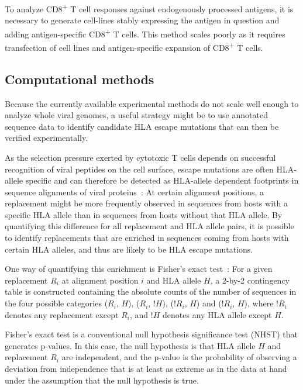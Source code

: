 \documentclass[fleqn,11pt]{SelfArx} %
\begin{document}
To analyze CD8\textsuperscript{+} T cell responses against endogenously processed antigens, it is necessary to generate cell-lines stably expressing the antigen in question and adding antigen-specific CD8\textsuperscript{+} T cells. This method scales poorly as it requires transfection of cell lines and antigen-specific expansion of CD8\textsuperscript{+} T cells.

\subsection{Computational methods}

Because the currently available experimental methods do not scale well enough to analyze whole viral genomes, a useful strategy might be to use annotated sequence data to identify candidate HLA escape mutations that can then be verified experimentally.

As the selection pressure exerted by cytotoxic T cells depends on successful recognition of viral peptides on the cell surface, escape mutations are often HLA-allele specific and can therefore be detected as HLA-allele dependent footprints in sequence alignments of viral proteins~\cite{Moore2002}: At certain alignment positions, a replacement might be more frequently observed in sequences from hosts with a specific HLA allele than in  sequences from hosts without that HLA allele. By quantifying this difference for all replacement and HLA allele pairs, it is possible to identify replacements that are enriched in sequences coming from hosts with certain HLA alleles, and thus are likely to be HLA escape mutations.

One way of quantifying this enrichment is Fisher's exact test~\cite{Fisher1922}: For a given replacement \(R_{i}\) at alignment position \(i\) and HLA allele \(H\), a 2-by-2 contingency table is constructed containing the absolute counts of the number of sequences in the four possible categories  (\(R_{i}\), \(H\)), (\(R_{i}\), \(!H\)), (\(!R_{i}\), \(H\)) and (\(!R_{i}\), \(H\)), where \(!R_{i}\) denotes any replacement except \(R_{i}\), and \(!H\) denotes any HLA allele except \(H\).

Fisher's exact test is a conventional null hypothesis significance test (NHST) that generates p-values. In this case, the null hypothesis is that HLA allele \(H\) and  replacement \(R_{i}\) are independent, and the p-value is the probability of observing a deviation from independence that is at least as extreme as in the data at hand under the assumption that the null hypothesis is true.
\end{document}
